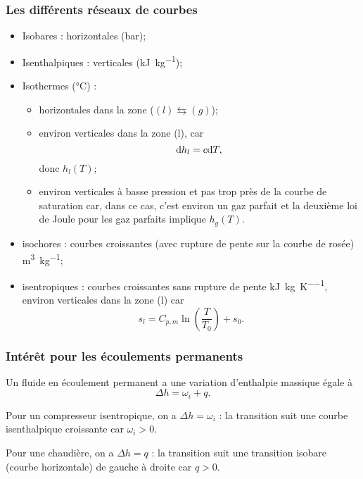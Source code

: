         \subsubsection{Les différents réseaux de courbes}

            \begin{itemize}
                \item Isobares : horizontales (\si[]{\bar});
                \item Isenthalpiques : verticales (\si[]{\kilo\joule\per\kilogram});
                \item Isothermes (\si[]{\celsius}) : 
                \begin{itemize}
                    \item horizontales dans la zone ($(l)\leftrightarrows (g)$);
                    \item environ verticales dans la zone (l), car
                    \begin{equation*}
                        \mathrm{d} h_l=c\mathrm{d} T,
                    \end{equation*}
                    donc $h_l(T)$;
                    \item environ verticales à basse pression et pas trop près de la courbe de saturation car, dans ce cas, c'est environ un gaz parfait et la deuxième loi de Joule pour les gaz parfaits implique $h_g(T)$.
                \end{itemize}
                \item isochores : courbes croissantes (avec rupture de pente sur la courbe de rosée) \si[]{\metre\cubed\per\kilogram};
                \item isentropiques : courbes croissantes sans rupture de pente \si[]{\kilo\joule\per\kilogram\per\kelvin}, environ verticales dans la zone (l) car 
                \begin{equation*}
                    s_l=C_{p,m}\ln\left(\frac{T}{T_0}\right)+s_0.
                \end{equation*}
            \end{itemize}

        \subsubsection{Intérêt pour les écoulements permanents}

            Un fluide en écoulement permanent a une variation d'enthalpie massique égale à 
            \begin{equation*}
                \Delta h=\omega_i+q.
            \end{equation*}
            \begin{example}
                Pour un compresseur isentropique, on a $\Delta h=\omega_i$ : la transition suit une courbe isenthalpique croissante car $\omega_i>0$.
            \end{example}
            \begin{example}
                Pour une chaudière, on a $\Delta h=q$ : la transition suit une transition isobare (courbe horizontale) de gauche à droite car $q>0$.
            \end{example}


